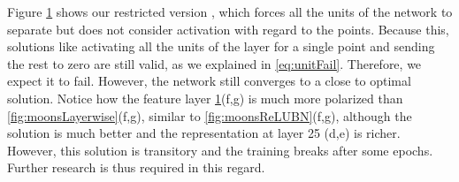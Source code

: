\begin{figure}
{{    %
    }
    \parbox{.195\textwidth}{%
    }
  }
  \caption{\SepUnit}
    \label{fig:moonsUnitwise}
\end{figure}


Figure \ref{fig:moonsUnitwise} shows our restricted version \SepUnit, which forces all the units of the network to separate but does not consider activation with regard to the points. Because this, solutions like activating all the units of the layer for a single point and sending the rest to zero are still valid, as we explained in \ref{eq:unitFail}. Therefore, we expect it to fail. However, the network still converges to a close to optimal solution. Notice how the feature layer \ref{fig:moonsUnitwise}(f,g) is much more polarized than \SepLayer \ref{fig:moonsLayerwise}(f,g), similar to \ReLUBN \ref{fig:moonsReLUBN}(f,g), although the solution is much better and the representation at layer 25 (d,e) is richer. However, this solution is transitory and the training breaks after some epochs. Further research is thus required in this regard.

